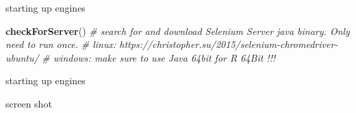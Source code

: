 \documentclass[ignorenonframetext,]{beamer}
\newenvironment{Shaded}{\begin{snugshade}}{\end{snugshade}}
\newcommand{\KeywordTok}[1]{\textcolor[rgb]{0.13,0.29,0.53}{\textbf{{#1}}}}
\newcommand{\DataTypeTok}[1]{\textcolor[rgb]{0.13,0.29,0.53}{{#1}}}
\newcommand{\DecValTok}[1]{\textcolor[rgb]{0.00,0.00,0.81}{{#1}}}
\newcommand{\StringTok}[1]{\textcolor[rgb]{0.31,0.60,0.02}{{#1}}}
\newcommand{\CommentTok}[1]{\textcolor[rgb]{0.56,0.35,0.01}{\textit{{#1}}}}
\newcommand{\NormalTok}[1]{{#1}}
\begin{document}
\begin{frame}[fragile]{starting up engines}

\begin{Shaded}
\begin{Highlighting}[]
\KeywordTok{checkForServer}\NormalTok{() }\CommentTok{# search for and download Selenium Server java binary.  Only need to run once.}
\CommentTok{# linux: https://christopher.su/2015/selenium-chromedriver-ubuntu/}
\CommentTok{# windows: make sure to use Java 64bit for R 64Bit !!!}
\end{Highlighting}
\end{Shaded}

\end{frame}

\begin{frame}[fragile]{starting up engines}

\begin{Shaded}
\end{Shaded}

\end{frame}

\begin{frame}[fragile]{screen shot}

\begin{Shaded}
\end{Shaded}

\end{frame}
\end{document}
